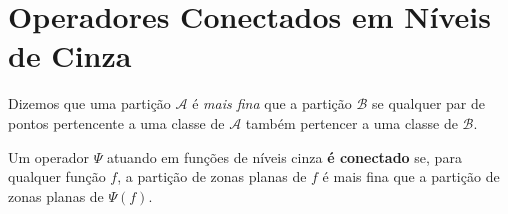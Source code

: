 \documentclass{article}
\begin{document}
\section{Operadores Conectados em Níveis de Cinza}

Dizemos que uma partição $\mathcal{A}$ é \textit{mais fina} que a partição $\mathcal{B}$ se qualquer par de pontos pertencente a uma classe  de $\mathcal{A}$ também pertencer a uma classe de $\mathcal{B}$.

\begin{definition}
    Um operador $\varPsi$ atuando em funções de níveis cinza \textbf{é conectado} se, para qualquer função $f$, a partição de zonas planas de $f$ é mais fina que a partição de zonas planas de $\varPsi(f)$.
\end{definition}
\end{document}
